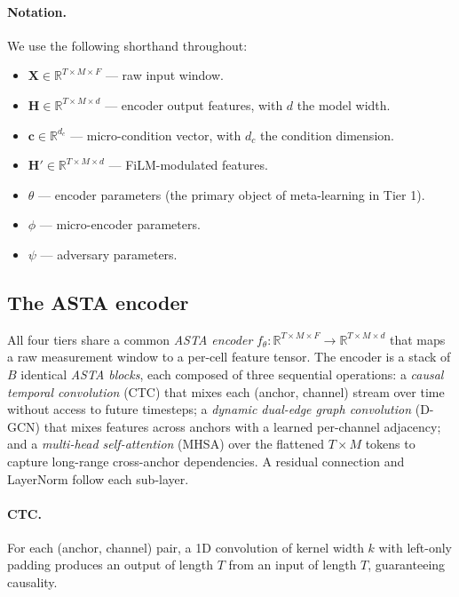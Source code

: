 \documentclass[11pt,letterpaper]{article}
\newcommand{\R}{\mathbb{R}}
\begin{document}
\paragraph{Notation.}
We use the following shorthand throughout:
\begin{itemize}
  \item $\bm{X} \in \R^{T \times M \times F}$ --- raw input window.
  \item $\bm{H} \in \R^{T \times M \times d}$ --- encoder output
    features, with $d$ the model width.
  \item $\bm{c} \in \R^{d_c}$ --- micro-condition vector, with
    $d_c$ the condition dimension.
  \item $\bm{H}' \in \R^{T \times M \times d}$ --- FiLM-modulated
    features.
  \item $\theta$ --- encoder parameters (the primary object of
    meta-learning in Tier 1).
  \item $\phi$ --- micro-encoder parameters.
  \item $\psi$ --- adversary parameters.
\end{itemize}

\subsection{The ASTA encoder}
\label{sec:asta}

All four tiers share a common \emph{ASTA encoder}
$f_\theta : \R^{T \times M \times F} \to \R^{T \times M \times d}$
that maps a raw measurement window to a per-cell feature tensor.
The encoder is a stack of $B$ identical \emph{ASTA blocks}, each
composed of three sequential operations: a \emph{causal temporal
convolution} (CTC) that mixes each (anchor, channel) stream over
time without access to future timesteps; a \emph{dynamic
dual-edge graph convolution} (D-GCN) that mixes features across
anchors with a learned per-channel adjacency; and a
\emph{multi-head self-attention} (MHSA) over the flattened
$T \times M$ tokens to capture long-range cross-anchor dependencies.
A residual connection and LayerNorm follow each sub-layer.

\paragraph{CTC.}
For each (anchor, channel) pair, a 1D convolution of kernel width
$k$ with left-only padding produces an output of length $T$ from
an input of length $T$, guaranteeing causality.
\end{document}
